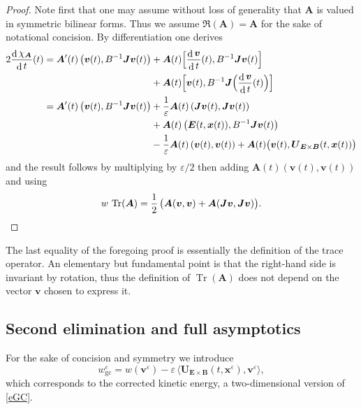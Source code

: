 \documentclass[10pt]{amsart}
\newcommand{\blangle}{\bigl\langle}
\newcommand{\brangle}{\bigr\rangle}
\let\eps\varepsilon
\DeclareMathOperator\dD{d}\let\dd\dD
\DeclareMathOperator{\Tr}{Tr}
\theoremstyle{plain}
\theoremstyle{definition}
\newcommand{\be}{\begin{equation}}
\newcommand{\ee}{\end{equation}}
\newcommand\bA{{\boldsymbol A}}
\newcommand\bB{{\boldsymbol B}}
\newcommand\bE{{\boldsymbol E}}
\newcommand\bJ{{\boldsymbol J}}
\newcommand\bU{{\boldsymbol U}}
\newcommand\bfv{{\boldsymbol v}}
\newcommand\bfx{{\boldsymbol x}}
\let\e w
\newcommand{\eGC}{w_\mathrm{gc}}
\newcommand{\EcB}{\bU_{\bE\times\bB}}
\begin{document}
\begin{proof}
Note first that one may assume without loss of generality that $\bA$ is valued in symmetric bilinear forms. Thus we assume $\Re(\bA)=\bA$ for the sake of notational concision. By differentiation one derives
\begin{align*}
2\frac{\dD\chi_\bA}{\dD t}(t)&=
\bA'(t)\left(\bfv(t),B^{-1}\bJ\bfv(t)\right)
+\bA(t)\Bigl[\frac{\dD\bfv}{\dD t}(t),B^{-1}\bJ\bfv(t)\Bigr]\\
&\hspace*{3.95cm}+\bA(t)\Bigl[\bfv(t),B^{-1}\bJ\Bigl(\frac{\dD\bfv}{\dD
t}(t)\Bigr)\Bigr]
\\
&=
\bA'(t)\left(\bfv(t),B^{-1}\bJ\bfv(t)\right)
+\frac1\eps\bA(t)\left(\bJ\bfv(t),\bJ\bfv(t)\right)\\
&\hspace*{3.95cm}+\bA(t)\left(\bE(t,\bfx(t)),B^{-1}\bJ\bfv(t)\right)
\\
&\hspace*{3.95cm}-\frac1\eps\bA(t)\left(\bfv(t),\bfv(t)\right)
+\bA(t)\bigl(\bfv(t),\EcB(t,\bfx(t))\bigr)
\end{align*}
and the result follows by multiplying by $\eps/2$ then adding $\bA(t)(\bfv(t),\bfv(t))$ and using
\[
\e\,\Tr(\bA)
=\frac12\,\bigl(\bA(\bfv,\bfv)
+\bA(\bJ\bfv,\bJ\bfv)\bigr).\qedhere
\]
\end{proof}

The last equality of the foregoing proof is essentially the definition of the trace operator. An elementary but fundamental point is that the right-hand side is invariant by rotation, thus the definition of $\Tr(\bA)$ does not depend on the vector $\bfv$ chosen to express it.

\subsection{Second elimination and full asymptotics}\label{s:hom-full}
For the sake of concision and symmetry we introduce
\be
\label{toy-egc}
\eGC^\eps=
\e(\bfv^\eps)-\eps\,\blangle\EcB(t,\bfx^\eps),\bfv^\eps\brangle,
\ee
which corresponds to the corrected kinetic energy, a two-dimensional version of \eqref{eGC}.
\end{document}
